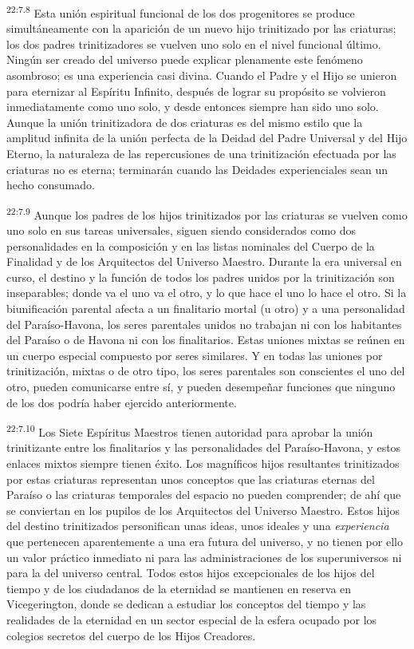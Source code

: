 \par
\textsuperscript{22:7.8} Esta unión espiritual funcional de los dos progenitores se produce simultáneamente con la aparición de un nuevo hijo trinitizado por las criaturas; los dos padres trinitizadores se vuelven uno solo en el nivel funcional último. Ningún ser creado del universo puede explicar plenamente este fenómeno asombroso; es una experiencia casi divina. Cuando el Padre y el Hijo se unieron para eternizar al Espíritu Infinito, después de lograr su propósito se volvieron inmediatamente como uno solo, y desde entonces siempre han sido uno solo. Aunque la unión trinitizadora de dos criaturas es del mismo estilo que la amplitud infinita de la unión perfecta de la Deidad del Padre Universal y del Hijo Eterno, la naturaleza de las repercusiones de una trinitización efectuada por las criaturas no es eterna; terminarán cuando las Deidades experienciales sean un hecho consumado.

\par
\textsuperscript{22:7.9} Aunque los padres de los hijos trinitizados por las criaturas se vuelven como uno solo en sus tareas universales, siguen siendo considerados como dos personalidades en la composición y en las listas nominales del Cuerpo de la Finalidad y de los Arquitectos del Universo Maestro. Durante la era universal en curso, el destino y la función de todos los padres unidos por la trinitización son inseparables; donde va el uno va el otro, y lo que hace el uno lo hace el otro. Si la biunificación parental afecta a un finalitario mortal (u otro) y a una personalidad del Paraíso-Havona, los seres parentales unidos no trabajan ni con los habitantes del Paraíso o de Havona ni con los finalitarios. Estas uniones mixtas se reúnen en un cuerpo especial compuesto por seres similares. Y en todas las uniones por trinitización, mixtas o de otro tipo, los seres parentales son conscientes el uno del otro, pueden comunicarse entre sí, y pueden desempeñar funciones que ninguno de los dos podría haber ejercido anteriormente.

\par
\textsuperscript{22:7.10} Los Siete Espíritus Maestros tienen autoridad para aprobar la unión trinitizante entre los finalitarios y las personalidades del Paraíso-Havona, y estos enlaces mixtos siempre tienen éxito. Los magníficos hijos resultantes trinitizados por estas criaturas representan unos conceptos que las criaturas eternas del Paraíso o las criaturas temporales del espacio no pueden comprender; de ahí que se conviertan en los pupilos de los Arquitectos del Universo Maestro. Estos hijos del destino trinitizados personifican unas ideas, unos ideales y una \textit{experiencia} que pertenecen aparentemente a una era futura del universo, y no tienen por ello un valor práctico inmediato ni para las administraciones de los superuniversos ni para la del universo central. Todos estos hijos excepcionales de los hijos del tiempo y de los ciudadanos de la eternidad se mantienen en reserva en Vicegerington, donde se dedican a estudiar los conceptos del tiempo y las realidades de la eternidad en un sector especial de la esfera ocupado por los colegios secretos del cuerpo de los Hijos Creadores.

